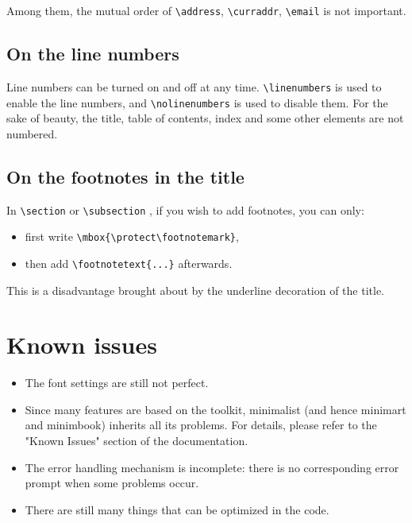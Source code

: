 \documentclass{minimart}
\providecommand{\minimalist}{\textsf{minimalist}}
\providecommand{\minimart}{\textsf{minimart}}
\providecommand{\minimbook}{\textsf{minimbook}}
\begin{document}
Among them, the mutual order of \lstinline|\address|, \lstinline|\curraddr|, \lstinline|\email| is not important.


\subsection{On the line numbers}
Line numbers can be turned on and off at any time. \lstinline|\linenumbers| is used to enable the line numbers, and \lstinline|\nolinenumbers| is used to disable them. For the sake of beauty, the title, table of contents, index and some other elements are not numbered.

\subsection{On the footnotes in the title}
In \lstinline|\section| or \lstinline|\subsection| , if you wish to add footnotes, you can only:
\begin{itemize}
    \item first write \lstinline|\mbox{\protect\footnotemark}|, 
    \item then add \lstinline|\footnotetext{...}| afterwards. 
\end{itemize}
This is a disadvantage brought about by the underline decoration of the title.


\section{Known issues}

\begin{itemize}[itemsep=.6em]
    \item The font settings are still not perfect.
    \item Since many features are based on the \ProjLib{} toolkit, \minimalist{} (and hence \minimart{} and \minimbook{}) inherits all its problems. For details, please refer to the "Known Issues" section of the \ProjLib{} documentation.
    \item The error handling mechanism is incomplete: there is no corresponding error prompt when some problems occur.
    \item There are still many things that can be optimized in the code.
\end{itemize}
\end{document}
